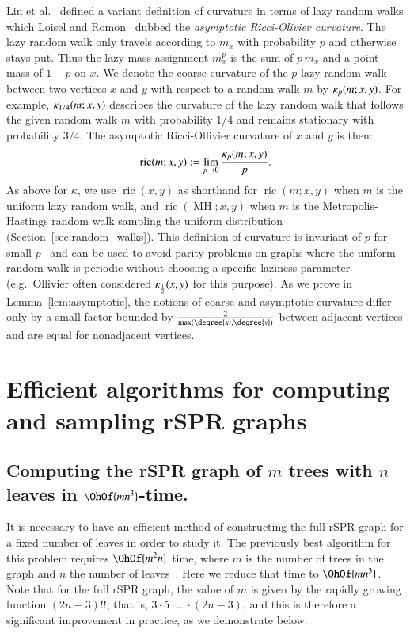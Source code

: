 \documentclass[]{elsarticle}
\newcommand{\MH}{\operatorname{MH}}
\newcommand{\curvature}[2][]{%
    \ifthenelse{\equal{#1}{}}%
		{\kappa(#2)}%
		{\kappa_{#1}(#2)}%
}
\newcommand{\ric}[1]{
	\operatorname{ric}(#1)%
}
\begin{document}
Lin et al.~\citep{lin2011ricci} defined a variant definition of curvature in terms of lazy random walks which Loisel and Romon~\citep{Loisel2014-hu} dubbed the \emph{asymptotic Ricci-Olivier curvature}.
The lazy random walk only travels according to $m_x$ with probability $p$ and otherwise stays put.
Thus the lazy mass assignment $m^p_x$ is the sum of $p\, m_x$ and a point mass of $1 - p$ on $x$.
We denote the coarse curvature of the $p$-lazy random walk between two vertices $x$ and $y$ with respect to a random walk $m$ by $\curvature[p]{m; x,y}$.
For example, $\curvature[1/4]{m; x,y}$ describes the curvature of the lazy random walk that follows the given random walk $m$ with probability $1/4$ and remains stationary with probability $3/4$.
The asymptotic Ricci-Ollivier curvature of $x$ and $y$ is then:
\begin{equation}
\ric{m; x, y} := \lim_{p \rightarrow 0} \frac{\curvature[p]{m; x,y}}{p} .
\label{eq:asympCurvatureDef}
\end{equation}
As above for $\kappa$, we use $\ric{x, y}$ as shorthand for $\ric{m; x, y}$ when $m$ is the uniform lazy random walk, and $\ric{\MH; x, y}$ when $m$ is the Metropolis-Hastings random walk sampling the uniform distribution (Section~\ref{sec:random_walks}).
This definition of curvature is invariant of $p$ for small $p$~\citep{Loisel2014-hu} and can be used to avoid parity problems on graphs where the uniform random walk is periodic without choosing a specific laziness parameter (e.g.~Ollivier often considered $\curvature[\frac{1}{2}]{x,y}$ for this purpose).
As we prove in Lemma~\ref{lem:asymptotic}, the notions of coarse and asymptotic curvature differ only by a small factor bounded by $\frac{2}{\max(\degree{x}, \degree{y})}$ between adjacent vertices and are equal for nonadjacent vertices.

\section{Efficient algorithms for computing and sampling rSPR graphs}

\subsection{Computing the rSPR graph of $m$ trees with $n$ leaves in $\OhOf{mn^3}$-time.}
\label{sec:computing_treespace}

It is necessary to have an efficient method of constructing the full rSPR graph for a fixed number of leaves in order to study it.
The previously best algorithm for this problem requires $\OhOf{m^2 n}$ time, where $m$ is the number of trees in the graph and $n$ the number of leaves~\citep{Whidden2015-yi}.
Here we reduce that time to $\OhOf{mn^3}$.
Note that for the full rSPR graph, the value of $m$ is given by the rapidly growing function $(2n-3)!!$, that is, $3 \cdot 5 \cdot \ldots \cdot (2n-3)$, and this is therefore a significant improvement in practice, as we demonstrate below.
\end{document}

